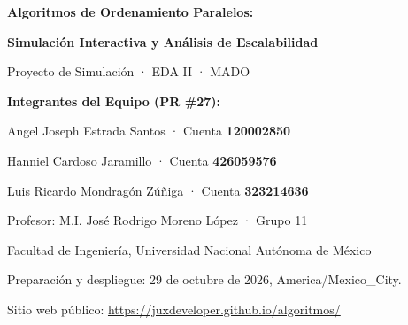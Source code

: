 \documentclass[11pt,letterpaper,oneside]{article}
\begin{document}
\ifdefined\PortadaPDF
  \IfFileExists{\PortadaPDF}{%
    \hypersetup{pageanchor=false}
    
    \hypersetup{pageanchor=true}
  }{}
\else
\fi

\hypersetup{pageanchor=true}

\begin{center}
  {\Large\bfseries Algoritmos de Ordenamiento Paralelos:}\par
  \smallskip
  {\Large\bfseries Simulación Interactiva y Análisis de Escalabilidad}\par
  \medskip
  {\large Proyecto de Simulación · EDA II · MADO}\par
  \bigskip
  \textbf{Integrantes del Equipo (PR \#27):}\par
  \smallskip
  Angel Joseph Estrada Santos · Cuenta \textbf{120002850}\par
  Hanniel Cardoso Jaramillo · Cuenta \textbf{426059576}\par
  Luis Ricardo Mondragón Zúñiga · Cuenta \textbf{323214636}\par
  \medskip
  Profesor: M.I. José Rodrigo Moreno López · Grupo 11\par
  Facultad de Ingeniería, Universidad Nacional Autónoma de México\par
  \smallskip
  \small Preparación y despliegue: 29 de octubre de 2026, America/Mexico\_City.\par
  Sitio web público: \url{https://juxdeveloper.github.io/algoritmos/}
\end{center}

\begin{abstract}
El ordenamiento paralelo constituye una de las áreas fundamentales del cómputo de alto rendimiento, donde la concurrencia permite trascender la cota secuencial inferior de comparaciones $\Omega(n \log n)$ en términos de tiempo de ejecución (lapso o \emph{span}). En este trabajo se presenta el diseño, fundamentación matemática e implementación de un laboratorio interactivo desarrollado en React y HTML5 que ilustra, paso a paso y de forma intuitiva, seis algoritmos de ordenamiento paralelos representativos de diversos paradigmas de hardware (PRAM, redes de comparadores, arquitecturas de memoria compartida, GPU/SIMD y memoria distribuida con paso de mensajes). Se analizan detalladamente el trabajo $T_1$, la profundidad $T_\infty$, el \emph{speedup} teórico y real, las barreras de sincronización y las restricciones de concurrencia impuestas por el GIL (\emph{Global Interpreter Lock}) en CPython. La plataforma se encuentra desplegada públicamente mediante GitHub Actions en GitHub Pages y versionada en el PR \#27 del repositorio oficial del curso.
\end{abstract}
\end{document}
